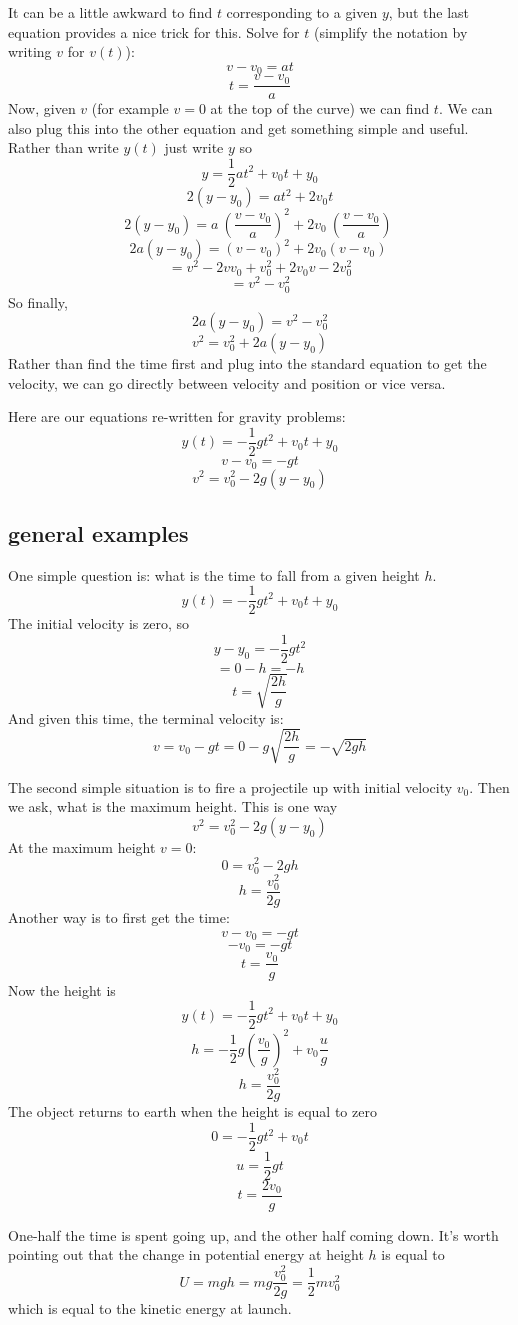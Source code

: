 \documentclass[11pt, oneside]{article}
\begin{document}
It can be a little awkward to find $t$ corresponding to a given $y$, but the last equation provides a nice trick for this.  Solve for $t$ (simplify the notation by writing $v$ for $v(t)$):
\[ v-v_0 = at \]
\[ t = \frac{v - v_0}{a} \]
Now, given $v$ (for example $v=0$ at the top of the curve) we can find $t$.  We can also plug this into the other equation and get something simple and useful.  Rather than write $y(t)$ just write $y$ so
\[ y = \frac{1}{2}at^2 + v_0t + y_0 \]
\[ 2(y-y_0) = at^2 + 2v_0t \]
\[ 2(y-y_0) = a \ (\frac{v - v_0}{a})^2 + 2v_0 \ (\frac{v - v_0}{a}) \ \]
\[ 2a(y - y_0) = (v - v_0)^2 + 2 v_0 (v - v_0) \ \]
\[ = v^2 - 2v v_0 + v_0^2 + 2v_0 v - 2v_0^2  \]
\[ = v^2  - v_0^2  \]
So finally,
\[ 2a(y - y_0) = v^2  - v_0^2  \]
\[ v^2 = v_0^2 + 2a(y - y_0) \]
Rather than find the time first and plug into the standard equation to get the velocity, we can go directly between velocity and position or vice versa.

Here are our equations re-written for gravity problems:
\[ y(t) = -\frac{1}{2}gt^2 + v_0t + y_0 \]
\[ v - v_0 = -gt \]
\[ v^2 = v_0^2 - 2g(y - y_0) \]
\subsection*{general examples}
One simple question is:  what is the time to fall from a given height $h$.
\[ y(t) = -\frac{1}{2}gt^2 + v_0t + y_0 \]
The initial velocity is zero, so
\[ y - y_0 = -\frac{1}{2}gt^2 \]
\[ = 0 - h = -h \]
\[ t = \sqrt{\frac{2h}{g}} \]
And given this time, the terminal velocity is:
\[ v = v_0 - gt = 0 - g \sqrt{\frac{2h}{g}} = -\sqrt{2gh} \]

The second simple situation is to fire a projectile up with initial velocity $v_0$.  Then we ask, what is the maximum height.  This is one way
\[ v^2 = v_0^2 - 2g(y - y_0) \]
At the maximum height $v = 0$:
\[ 0 = v_0^2 - 2gh \]
\[ h = \frac{v_0^2}{2g} \]
Another way is to first get the time:
\[ v - v_0 = -gt \]
\[ - v_0 = -gt \]
\[ t = \frac{v_0}{g} \]
Now the height is
\[ y(t) = -\frac{1}{2}gt^2 + v_0t + y_0 \]
\[ h = -\frac{1}{2}g(\frac{v_0}{g})^2 + v_0 \frac{u}{g} \]
\[ h = \frac{v_0^2}{2g}  \]
The object returns to earth when the height is equal to zero
\[ 0 = -\frac{1}{2}gt^2 + v_0t \]
\[ u = \frac{1}{2}gt \]
\[ t = \frac{2v_0}{g} \]

One-half the time is spent going up, and the other half coming down.  It's worth pointing out that the change in potential energy at height $h$ is equal to 
\[ U = mgh = mg \frac{ v_0^2}{2g} = \frac{1}{2} m v_0^2 \]
which is equal to the kinetic energy at launch.
\end{document}
